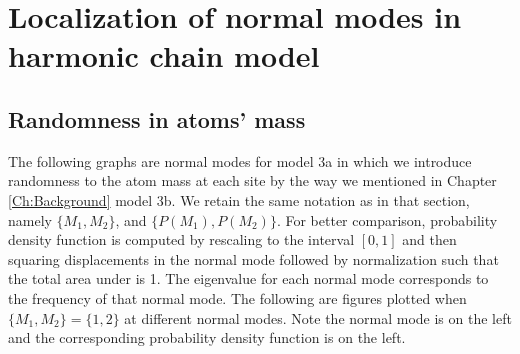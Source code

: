 


\newpage
\section{Localization of normal modes in harmonic chain model}
\subsection{Randomness in atoms' mass}
The following graphs are normal modes for model 3a in which we introduce randomness to the atom mass at each site by the way we mentioned in Chapter \ref{Ch:Background} model 3b. We retain the same notation as in that section, namely $\{M_1,M_2\}$, and $\{P(M_1),P(M_2)\}$.
For better comparison, probability density function is computed by rescaling to the interval $[0,1]$ and then squaring displacements in the normal mode followed by normalization such that the total area under is 1.
The eigenvalue for each normal mode corresponds to the frequency of that normal mode.
The following are figures plotted when $\{M_1,M_2\} = \{1,2\}$ at different normal modes. Note the normal mode is on the left and the corresponding probability density function is on the left.

